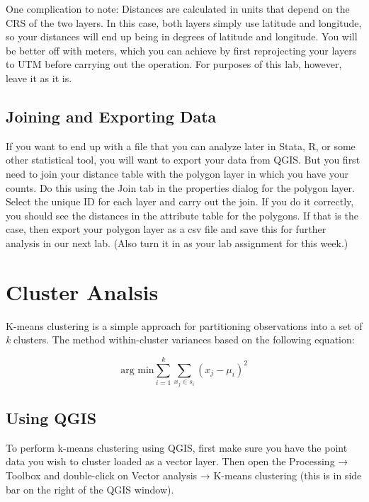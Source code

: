 \documentclass[]{book}
\begin{document}
One complication to note: Distances are calculated in units that depend on the CRS of the two layers. In this case, both layers simply use latitude and longitude, so your distances will end up being in degrees of latitude and longitude. You will be better off with meters, which you can achieve by first reprojecting your layers to UTM before carrying out the operation. For purposes of this lab, however, leave it as it is.

\hypertarget{joining-and-exporting-data}{%
\section{Joining and Exporting Data}\label{joining-and-exporting-data}}

If you want to end up with a file that you can analyze later in Stata, R, or some other statistical tool, you will want to export your data from QGIS. But you first need to join your distance table with the polygon layer in which you have your counts. Do this using the Join tab in the properties dialog for the polygon layer. Select the unique ID for each layer and carry out the join. If you do it correctly, you should see the distances in the attribute table for the polygons. If that is the case, then export your polygon layer as a csv file and save this for further analysis in our next lab. (Also turn it in as your lab assignment for this week.)

\hypertarget{clustering}{%
\chapter{Cluster Analsis}\label{clustering}}

K-means clustering is a simple approach for partitioning observations into a set of \emph{k} clusters. The method within-cluster variances based on the following equation:

\[ \text{arg min}\sum_{i=1}^k\sum_{x_j \in s_i}\left(x_j - \mu_i \right)^2 \]

\hypertarget{using-qgis}{%
\section{Using QGIS}\label{using-qgis}}

To perform k-means clustering using QGIS, first make sure you have the point data you wish to cluster loaded as a vector layer. Then open the Processing → Toolbox and double-click on Vector analysis → K-means clustering (this is in side bar on the right of the QGIS window).
\end{document}
